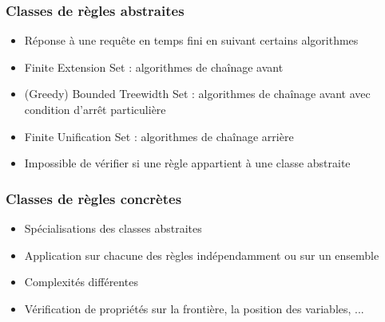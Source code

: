 \begin{frame}%
	\frametitle{Classes de règles abstraites}
	\vspace{10mm}
	\begin{itemize}
		\item Réponse à une requête en temps fini en suivant certains algorithmes
		\item Finite Extension Set : algorithmes de chaînage avant
		\item (Greedy) Bounded Treewidth Set : algorithmes de chaînage avant avec condition
			d'arrêt particulière
		\item Finite Unification Set : algorithmes de chaînage arrière
		\item Impossible de vérifier si une règle appartient à une classe abstraite
	\end{itemize}
\end{frame}

\begin{frame}%
	\frametitle{Classes de règles concrètes}
	\vspace{10mm}
	\begin{itemize}
		\item Spécialisations des classes abstraites
		\item Application sur chacune des règles indépendamment ou sur un ensemble
		\item Complexités différentes
		\item Vérification de propriétés sur la frontière, la position des variables, ...
	\end{itemize}
\end{frame}

